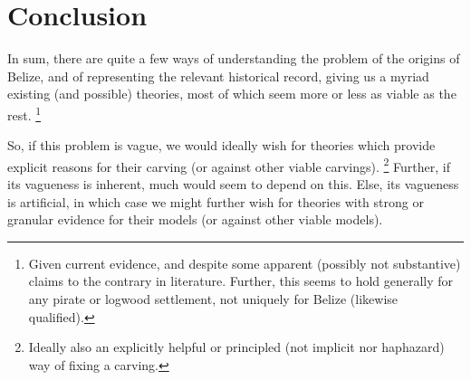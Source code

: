 \section{Conclusion}
\label{s:concl}
	In sum, there are quite a few ways of understanding the problem of the origins of Belize, and of representing the relevant historical record, giving us a myriad existing (and possible) theories, most of which seem more or less as viable as the rest.%
	\footnote{Given current evidence, and despite some apparent (possibly not substantive) claims to the contrary in literature. Further, this seems to hold generally for any pirate or logwood settlement, not uniquely for Belize (likewise qualified).}
	
	So, if this problem is vague, we would ideally wish for theories which provide explicit reasons for their carving (or against other viable carvings).%
	\footnote{Ideally also an explicitly helpful or principled (not implicit nor haphazard) way of fixing a carving.}
	Further, if its vagueness is inherent, much would seem to depend on this. Else, its vagueness is artificial, in which case we might further wish for theories with strong or granular evidence for their models (or against other viable models).
%
%
%
%

